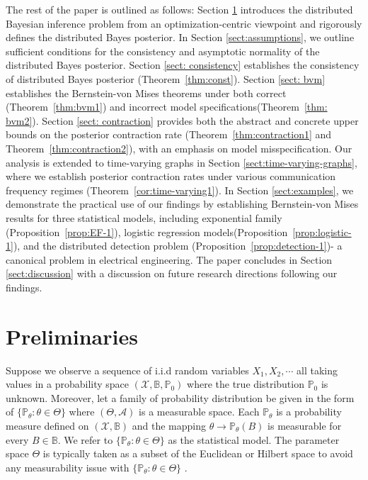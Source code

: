 \documentclass[twoside,11pt]{article}
\numberwithin{equation}{section}
\newcommand\bP{\mathbb{P}}
\begin{document}
The rest of the paper is outlined as follows: Section \ref{sect: preliminary} introduces the distributed Bayesian inference problem from an optimization-centric viewpoint and rigorously defines the distributed Bayes posterior. In Section \ref{sect:assumptions}, we outline sufficient conditions for the consistency and asymptotic normality of the distributed Bayes posterior. Section \ref{sect: consistency} establishes the consistency of distributed Bayes posterior (Theorem~\ref{thm:const}). Section \ref{sect: bvm} establishes the Bernstein-von Mises theorems under both correct (Theorem~\ref{thm:bvm1}) and incorrect model specifications(Theorem~\ref{thm: bvm2}). Section \ref{sect: contraction} provides both the abstract and concrete upper bounds on the posterior contraction rate (Theorem~\ref{thm:contraction1} and Theorem~\ref{thm:contraction2}), with an emphasis on model misspecification. Our analysis is extended to time-varying graphs in Section \ref{sect:time-varying-graphs}, where we establish posterior contraction rates under various communication frequency regimes (Theorem~\ref{cor:time-varying1}). In Section \ref{sect:examples}, we demonstrate the practical use of our findings by establishing Bernstein-von Mises results for three statistical models, including exponential family (Proposition~\ref{prop:EF-1}), logistic regression models(Proposition~\ref{prop:logistic-1}), and the distributed detection problem (Proposition~\ref{prop:detection-1})- a canonical problem in electrical engineering. The paper concludes in Section \ref{sect:discussion} with a discussion on future research directions following our findings.



\section{Preliminaries} \label{sect: preliminary}


Suppose we observe a sequence of i.i.d random variables $X_1, X_2, \cdots$ all taking values in a probability space $(\mathcal{X}, \mathbb{B}, \bP_0)$ where the true distribution $\bP_0$ is unknown. Moreover, let a family of probability distribution be given in the form of $\{\bP_\theta: \theta \in \Theta\}$ where $(\Theta, \mathcal{A})$ is a measurable space. Each $\bP_\theta$ is a probability measure defined on $(\mathcal{X}, \mathbb{B})$ and the mapping $\theta \to \bP_\theta(B)$ is measurable for every $B \in \mathbb{B}$. We refer to $\{\bP_\theta: \theta \in \Theta\}$ as the statistical model. The parameter space $\Theta$ is typically taken as a subset of the Euclidean or Hilbert space to avoid any measurability issue with $\{\bP_\theta: \theta \in \Theta\}$ \citep{ghosal2017fundamentals}. 
\end{document}
